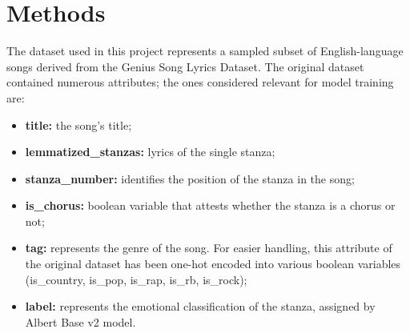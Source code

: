 \chapter{Methods}
\label{ch:capitolo2}


The dataset used in this project represents a sampled subset of English-language
songs derived from the Genius Song Lyrics Dataset\textsuperscript{\cite{geniusdataset}}.
The original dataset contained numerous attributes; the ones considered
relevant for model training are:
\begin{itemize}
    \item \textbf{title:} the song's title;

    \item \textbf{lemmatized\_stanzas:} lyrics of the single stanza;
    
    \item \textbf{stanza\_number:} identifies the position of the stanza in the song;

    \item \textbf{is\_chorus:} boolean variable that attests whether the stanza is
        a chorus or not;
    
    \item \textbf{tag:} represents the genre of the song. For easier handling,
        this attribute of the original dataset has been one-hot encoded into various boolean variables
        (is\_country, is\_pop, is\_rap, is\_rb, is\_rock);

    \item \textbf{label:} represents the emotional classification of the stanza,
        assigned by Albert Base v2\textsuperscript{\cite{albert-base-v2}} model.
    
\end{itemize}

